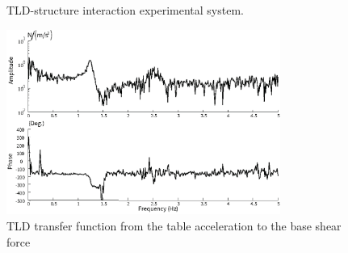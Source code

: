 \begin{figure}[!ht]
\centering
{}
\caption{TLD-structure interaction experimental system.}
\label{fig:3-4}
\end{figure}

\begin{figure}[!ht]
\centering
\includegraphics[width=0.8\textwidth] {figure/3-5.eps}
\caption{TLD transfer function from the table acceleration to the base shear force}
\label{fig:3-5}
\end{figure}

